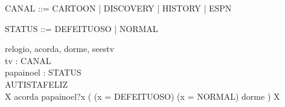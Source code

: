 \begin{zed}
   CANAL ::= CARTOON | DISCOVERY | HISTORY | ESPN
\end{zed}
\begin{zed}
   STATUS ::= DEFEITUOSO | NORMAL
\end{zed}
\begin{circus}
 \circchannel relogio, acorda, dorme, seestv \\
 \circchannel tv : CANAL \\
 \circchannel papainoel : STATUS \\
 \circprocess AUTISTAFELIZ \circdef \circbegin \\
  \circspot %
    \circmu X \circspot acorda %
    \then %
      papainoel?x \then
    (
      \circif (x = DEFEITUOSO) \circthen \Skip%
      \circelse (x = NORMAL) \circthen dorme \then \Skip
      \circfi
    )
    \circseq X%
 \circend
\end{circus}
